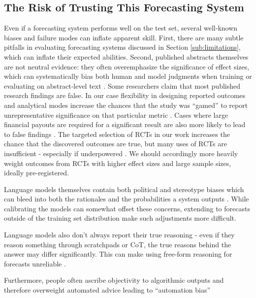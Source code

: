 \documentclass[12pt,a4paper]{article}
\begin{document}
\subsection{The Risk of Trusting This Forecasting System}
\label{subsec:risk_trusting_system}

Even if a forecasting system performs well on the test set, several well‐known biases and failure modes can inflate apparent skill. First, there are many subtle pitfalls in evaluating forecasting systems discussed in Section \ref{sub:limitations}, which can inflate their expected abilities. Second, published abstracts themselves are not neutral evidence: they often overemphasize the significance of effect sizes, which can systematically bias both human and model judgments when training or evaluating on abstract‐level text . Some researchers claim that most published research findings are false. In our case flexibility in designing reported outcomes and analytical modes increase the chances that the study was ``gamed'' to report unrepresentative significance on that particular metric . Cases where large financial payouts are required for a significant result are also more likely to lead to false findings . The targeted selection of RCTs in our work increases the chance that the discovered outcomes are true, but many uses of RCTs are insufficient - especially if underpowered . We should accordingly more heavily weight outcomes from RCTs with higher effect sizes and large sample sizes, ideally pre-registered.

Language models themselves contain both political and stereotype biases which can bleed into both the rationales and the probabilities a system outputs  . While calibrating the models can somewhat offset these concerns, extending to forecasts outside of the training set distribution make such adjustments more difficult.

Language models also don't always report their true reasoning  - even if they reason something through scratchpads or CoT, the true reasons behind the answer may differ significantly. This can make using free-form reasoning for forecasts unreliable . 

Furthermore, people often ascribe objectivity to algorithmic outputs and therefore overweight automated advice leading to ``automation bias'' 
\end{document}
